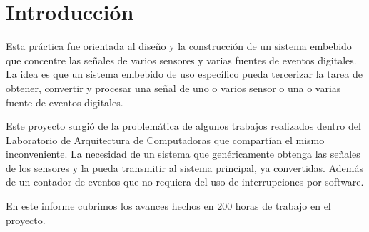 \section{Introducción} %
\label{sec:introduccion}

Esta práctica fue orientada al diseño y la construcción de un sistema embebido que concentre las señales de varios sensores y varias fuentes de eventos digitales. La idea es que un sistema embebido de uso específico pueda tercerizar la tarea de obtener, convertir y procesar una señal de uno o varios sensor o una o varias fuente de eventos digitales.

Este proyecto surgió de la problemática de algunos trabajos realizados dentro del Laboratorio de Arquitectura de Computadoras que compartían el mismo inconveniente. La necesidad de un sistema que genéricamente obtenga las señales de los sensores y la pueda transmitir al sistema principal, ya convertidas. Además de un contador de eventos que no requiera del uso de interrupciones por software.

En este informe cubrimos los avances hechos en 200 horas de trabajo en el proyecto.

